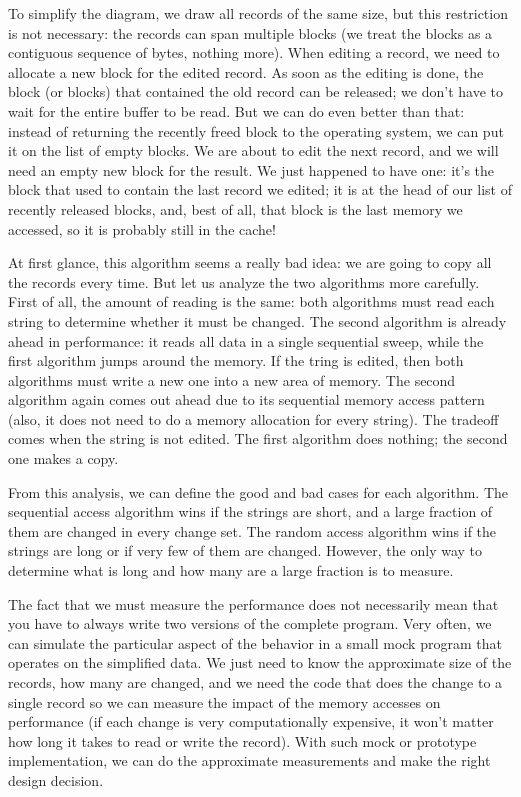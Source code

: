To simplify the diagram, we draw all records of the same size, but this restriction is not necessary: the records can span multiple blocks (we treat the blocks as a contiguous sequence of bytes, nothing more). When editing a record, we need to allocate a new block for the edited record. As soon as the editing is done, the block (or blocks) that contained the old record can be released; we don't have to wait for the entire buffer to be read. But we can do even better than that: instead of returning the recently freed block to the operating system, we can put it on the list of empty blocks. We are about to edit the next record, and we will need an empty new block for the result. We just happened to have one: it's the block that used to contain the last record we edited; it is at the head of our list of recently released blocks, and, best of all, that block is the last memory we accessed, so it is probably still in the cache!

At first glance, this algorithm seems a really bad idea: we are going to copy all the records every time. But let us analyze the two algorithms more carefully. First of all, the amount of reading is the same: both algorithms must read each string to determine whether it must be changed. The second algorithm is already ahead in performance: it reads all data in a single sequential sweep, while the first algorithm jumps around the memory. If the tring is edited, then both algorithms must write a new one into a new area of memory. The second algorithm again comes out ahead due to its sequential memory access pattern (also, it does not need to do a memory allocation for every string). The tradeoff comes when the string is not edited. The first algorithm does nothing; the second one makes a copy.

From this analysis, we can define the good and bad cases for each algorithm. The sequential access algorithm wins if the strings are short, and a large fraction of them are changed in every change set. The random access algorithm wins if the strings are long or if very few of them are changed. However, the only way to determine what is long and how many are a large fraction is to measure.

The fact that we must measure the performance does not necessarily mean that you have to always write two versions of the complete program. Very often, we can simulate the particular aspect of the behavior in a small mock program that operates on the simplified data. We just need to know the approximate size of the records, how many are changed, and we need the code that does the change to a single record so we can measure the impact of the memory accesses on performance (if each change is very computationally expensive, it won't matter how long it takes to read or write the record). With such mock or prototype implementation, we can do the approximate measurements and make the right design decision.

